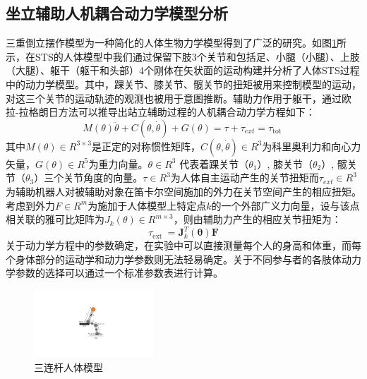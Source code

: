 \subsection{坐立辅助人机耦合动力学模型分析}  
三重倒立摆作模型为一种简化的人体生物力学模型得到了广泛的研究。如图\ref{fig:4-1}所示，在STS的人体模型中我们通过保留下肢3个关节和包括足、小腿（小腿）、上肢（大腿）、躯干（躯干和头部）4个刚体在矢状面的运动构建并分析了人体STS过程中的动力学模型。其中，踝关节、膝关节、髋关节的扭矩被用来控制模型的运动，对这三个关节的运动轨迹的观测也被用于意图推断。辅助力作用于躯干，通过欧拉-拉格朗日方法可以推导出站立辅助过程的人机耦合动力学方程如下：
\begin{equation}
    M(\theta) \ddot{\theta}+C(\theta, \dot{\theta})+G(\theta)=\tau+\tau_{e x t}=\tau_{\text {tot }}
    \label{eq:4-1}
\end{equation}
其中$M(\theta)\in R^{3\times 3}$是正定的对称惯性矩阵，$C(\theta, \dot{\theta})\in R^3$为科里奥利力和向心力矢量，$G(\theta)\in R^5$为重力向量。$\theta \in R^3$ 代表着踝关节（$\theta_1$）, 膝关节（$\theta_2$）, 髋关节（$\theta_3$）三个关节角度的向量。$\tau \in R^3$为人体自主运动产生的关节扭矩而$\tau_{ext} \in R^3$为辅助机器人对被辅助对象在笛卡尔空间施加的外力在关节空间产生的相应扭矩。考虑到外力$F\in R^m$为施加于人体模型上特定点$k$的一个外部广义力向量，设与该点相关联的雅可比矩阵为$J_k(\theta)\in R^{m\times 3}$，则由辅助力产生的相应关节扭矩为：
\begin{equation}
    \tau_{\text {ext }}=\boldsymbol{J}_k^T(\boldsymbol{\theta}) \boldsymbol{F}
    \label{eq:4-2}
\end{equation}
关于动力学方程中的参数确定，在实验中可以直接测量每个人的身高和体重，而每个身体部分的运动学和动力学参数则无法轻易确定。关于不同参与者的各肢体动力学参数的选择可以通过一个标准参数表进行计算\cite{tozerenHumanBodyDynamics2000}。

\begin{figure}[!t]
    \centering\includegraphics[width=0.4\textwidth]{figures/4-Fig-1.pdf}
    \caption{三连杆人体模型}
    \label{fig:4-1}
\end{figure}
